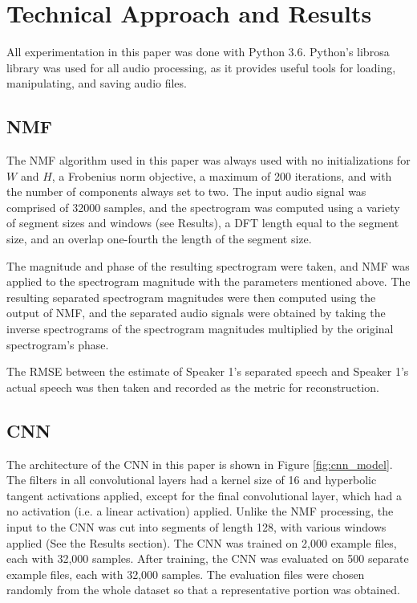 \documentclass[12pt,chapterheads]{ucsd}
\begin{document}
\section{Technical Approach and Results}
All experimentation in this paper was done with Python 3.6. Python's librosa library was used for all audio processing, as it provides useful tools for loading, manipulating, and saving audio files.

\subsection{NMF}
The NMF algorithm used in this paper was always used with no initializations for $W$ and $H$, a Frobenius norm objective, a maximum of 200 iterations, and with the number of components always set to two. The input audio signal was comprised of 32000 samples, and the spectrogram was computed using a variety of segment sizes and windows (see Results), a DFT length equal to the segment size, and an overlap one-fourth the length of the segment size.

The magnitude and phase of the resulting spectrogram were taken, and NMF was applied to the spectrogram magnitude with the parameters mentioned above. The resulting separated spectrogram magnitudes were then computed using the output of NMF, and the separated audio signals were obtained by taking the inverse spectrograms of the spectrogram magnitudes multiplied by the original spectrogram's phase.

The RMSE between the estimate of Speaker 1's separated speech and Speaker 1's actual speech was then taken and recorded as the metric for reconstruction.

\subsection{CNN}
The architecture of the CNN in this paper is shown in Figure \ref{fig:cnn_model}. The filters in all convolutional layers had a kernel size of 16 and hyperbolic tangent activations applied, except for the final convolutional layer, which had a no activation (i.e. a linear activation) applied. Unlike the NMF processing, the input to the CNN was cut into segments of length 128, with various windows applied (See the Results section). The CNN was trained on 2,000 example files, each with 32,000 samples. After training, the CNN was evaluated on 500 separate example files, each with 32,000 samples. The evaluation files were chosen randomly from the whole dataset so that a representative portion was obtained.
\end{document}
